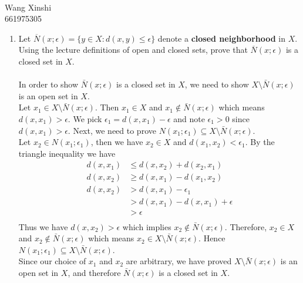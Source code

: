 \documentclass{article}
\begin{document}
\\
Wang Xinshi\\
661975305\\
\medskip



\begin{enumerate}
\item Let $\displaystyle \overline{N}(x;\epsilon) = \{ y \in X: d(x,y)\le \epsilon \}$ denote a {\bf closed neighborhood} in $X$. \\[.05in] Using the lecture definitions of open and closed sets, prove that $\displaystyle \overline{N}(x;\epsilon)$ is a closed set in $X$.\\\\
   
 In order to show $\bar{N}(x;\epsilon)$ is a closed set in $X$, we need to show $X \setminus \bar{N}(x;\epsilon)$ is an open set in $X$.\\

Let $x_1 \in X \setminus \bar{N}(x; \epsilon)$. Then $x_1 \in X$ and $x_1 \notin \bar{N}(x; \epsilon)$ which means $d(x,x_1) > \epsilon $. We pick $\epsilon_1 = d(x,x_1) - \epsilon$ and note $\epsilon_1>0$ since $d(x,x_1) > \epsilon $. Next, we need to prove $N(x_1; \epsilon_1) \subseteq X \setminus \bar{N}(x; \epsilon)$.\\

Let $x_2 \in N(x_1; \epsilon_1)$, then we have $x_2 \in X$ and $d(x_1,x_2) < \epsilon_1$. By the triangle inequality we have 
\begin{align*}
	d(x,x_1) &\leq d(x,x_2) + d(x_2,x_1)\\
	d(x,x_2) &\geq d(x,x_1) - d(x_1,x_2)\\
	d(x,x_2) &> d(x,x_1) - \epsilon_1\\
			 &> d(x,x_1) - d(x,x_1) + \epsilon\\
			 &> \epsilon\\
\end{align*}
Thus we have $d(x,x_2)> \epsilon$ which implies $x_2 \notin \bar{N}(x;\epsilon)$. Therefore, $x_2 \in X$ and $x_2 \notin \bar{N}(x;\epsilon)$ which means $x_2 \in X \setminus \bar{N}(x;\epsilon)$. Hence $N(x_1; \epsilon_1) \subseteq X \setminus \bar{N}(x;\epsilon)$.\\

Since our choice of $x_1$ and $x_2$ are arbitrary, we have proved $X \setminus \bar{N}(x;\epsilon)$ is an open set in $X$, and therefore $\bar{N}(x;\epsilon)$ is a closed set in $X$.\\\\


\end{enumerate}
\end{document}
